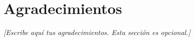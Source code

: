 
\chapter*{Agradecimientos}

\textit{[Escribe aquí tus agradecimientos. Esta sección es opcional.]}
